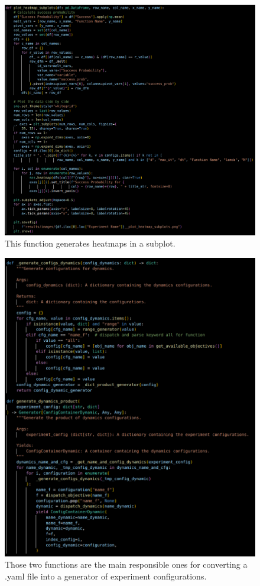 \documentclass[a4paper, 11pt]{article}
\begin{document}
\begin{figure}[!ht]
\centering
\includegraphics[width=1\textwidth]{imgs/visualize.png}
\caption{This function generates heatmaps in a subplot.} \vspace{-1em}
\label{fig:visualize}
\end{figure}

\begin{figure}[!ht]
\centering
\includegraphics[width=1\textwidth]{imgs/experimentgeneration.png}
\caption{Those two functions are the main responsible ones for converting a .yaml file into a generator of experiment configurations.} \vspace{-1em}
\label{fig:experimentgeneration}
\end{figure}
\end{document}
